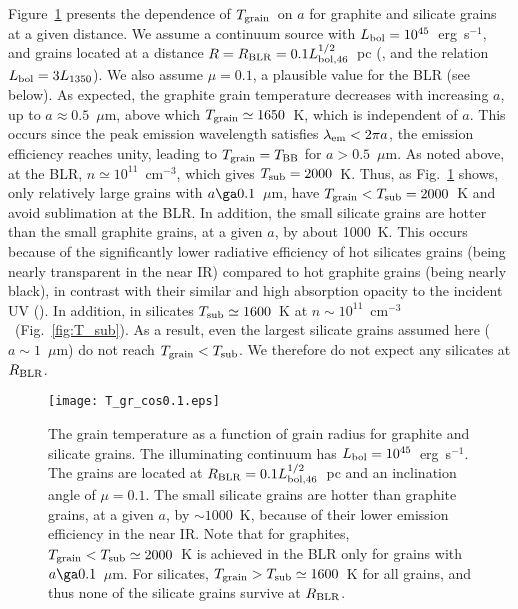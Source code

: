 \documentclass[a4paper,fleqn,usenatbib]{mnras}
\newcommand{\ergs}{erg~s$^{-1}$}
\newcommand{\cmt}{cm$^{-3}$}
\newcommand{\mic}{\mbox{$\mu$m}}
\newcommand{\Tsub}{\mbox{$T_{\rm sub}$}}
\newcommand{\Tgr}{\mbox{$T_{\rm grain}$}}
\begin{document}
	
Figure~\ref{fig:T_gr_cos0.1} presents the dependence of \Tgr\ on $a$ for graphite and silicate grains at a given distance. We assume a continuum source with $L_{\rm bol} = 10^{45}$~\ergs, and grains located at a distance
$R=R_{\rm BLR} = 0.1 L_{\rm bol, 46}^{1/2}$~pc (\citealt{Kaspi07}, and the relation $L_{\rm bol}=3L_{1350}$). 
We also assume $\mu=0.1$, a plausible value for the BLR (see below).
As expected, the graphite grain temperature decreases with increasing $a$, up to $a\approx 0.5$~\mic, 
above which $\Tgr\simeq1650$~K, which is independent of $a$. This occurs since the peak emission wavelength satisfies 
$\lambda_{\rm em}<2\pi a$, the emission efficiency reaches unity, leading to $\Tgr=T_{\rm BB}$ for $a> 0.5$~\mic.
As noted above, at the BLR, $n\simeq 10^{11}$~cm$^{-3}$, which gives  $\Tsub=2000$~K. Thus, as Fig.~\ref{fig:T_gr_cos0.1}
shows, only relatively large grains with $a\ga0.1$~\mic, have $\Tgr<\Tsub=2000$~K and avoid sublimation at the BLR. In addition, the small silicate grains are hotter than the small graphite grains, at a given
$a$, by about 1000~K. This occurs because of the significantly lower radiative efficiency of hot silicates grains
(being nearly transparent in the near IR) compared to hot graphite grains (being nearly black), in contrast with their similar and high absorption opacity to the incident UV (\citealt{draine_lee84, LaorDraine93}). In addition, in silicates 
$\Tsub\simeq 1600$~K at $n\sim10^{11}$~\cmt\ (Fig.~\ref{fig:T_sub}). 
As a result, even the largest silicate
grains assumed here ($a\sim 1$~\mic) do not reach $\Tgr<\Tsub$. We therefore do not expect any silicates at $R_{\rm BLR}$.


\begin{figure}
\texttt{[image: T\_gr\_cos0.1.eps]}
\caption{The grain temperature as a function of grain radius for graphite and silicate grains. The illuminating continuum has $L_{\rm bol}=10^{45}$~\ergs. The grains are located at $R_{\rm BLR}=0.1L_{\rm bol, 46}^{1/2}$~pc and an inclination angle of $\mu=0.1$. The small silicate grains are hotter than graphite grains, at a given $a$, 
by $\sim 1000$~K, because of their lower emission 
efficiency in the near IR. Note that for graphites, $\Tgr<\Tsub\simeq2000$~K  is achieved in the BLR 
only for grains with $a\ga 0.1$~\mic. For silicates, $\Tgr>\Tsub\simeq1600$~K for all grains, and thus
none of the silicate grains survive at $R_{\rm BLR}$.}
\label{fig:T_gr_cos0.1}
\end{figure}
\end{document}
